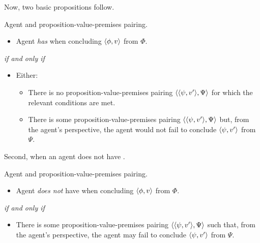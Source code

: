 \begin{note}
  Now, two basic propositions follow.
  \begin{proposition}
    Agent and proposition-value-premises pairing.

    \begin{itemize}
    \item
      Agent \emph{has} \zS{} when concluding \(\langle \phi, v \rangle\) from \(\Phi\).
    \end{itemize}

    \emph{if and only if}

    \begin{itemize}
    \item
      Either:
      \begin{itemize}
      \item
        There is no proposition-value-premises pairing \(\langle \langle \psi, v' \rangle, \Psi \rangle\) for which the relevant conditions are met.
      \item
        There is some proposition-value-premises pairing \(\langle \langle \psi, v' \rangle, \Psi \rangle\) but, from the agent's perspective, the agent would not fail to conclude \(\langle \psi, v' \rangle\) from \(\Psi\).
      \end{itemize}
    \end{itemize}
  \end{proposition}

  Second, when an agent does not have \zS{}.

  \begin{proposition}
    Agent and proposition-value-premises pairing.
    \begin{itemize}
    \item
      Agent \emph{does not} have \zS{} when concluding \(\langle \phi, v \rangle\) from \(\Phi\).
    \end{itemize}

    \emph{if and only if}

    \begin{itemize}
    \item
      There is some proposition-value-premises pairing \(\langle \langle \psi, v' \rangle, \Psi \rangle\) such that, from the agent's perspective, the agent may fail to conclude \(\langle \psi, v' \rangle\) from \(\Psi\).
    \end{itemize}
  \end{proposition}
\end{note}

